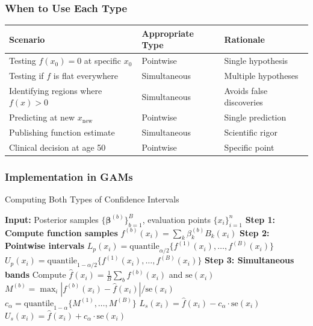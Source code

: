 \documentclass[12pt]{article}
\begin{document}
\subsubsection{When to Use Each Type}

\begin{table}[h]
\centering
\begin{tabular}{lll}
\toprule
\textbf{Scenario} & \textbf{Appropriate Type} & \textbf{Rationale} \\
\midrule
Testing $f(x_0) = 0$ at specific $x_0$ & Pointwise & Single hypothesis \\
Testing if $f$ is flat everywhere & Simultaneous & Multiple hypotheses \\
Identifying regions where $f(x) > 0$ & Simultaneous & Avoids false discoveries \\
Predicting at new $x_{\text{new}}$ & Pointwise & Single prediction \\
Publishing function estimate & Simultaneous & Scientific rigor \\
Clinical decision at age 50 & Pointwise & Specific point \\
\bottomrule
\end{tabular}
\end{table}

\subsubsection{Implementation in GAMs}

\begin{algorithm}
\caption{Computing Both Types of Confidence Intervals}
\begin{algorithmic}[1]
\State \textbf{Input:} Posterior samples $\{\boldsymbol{\beta}^{(b)}\}_{b=1}^B$, evaluation points $\{x_i\}_{i=1}^n$
\State \textbf{Step 1: Compute function samples}
       \State $f^{(b)}(x_i) = \sum_k \beta_k^{(b)} B_k(x_i)$
   \EndFor
\EndFor
\State 
\State \textbf{Step 2: Pointwise intervals}
   \State $L_p(x_i) = \text{quantile}_{\alpha/2}\{f^{(1)}(x_i), \ldots, f^{(B)}(x_i)\}$
   \State $U_p(x_i) = \text{quantile}_{1-\alpha/2}\{f^{(1)}(x_i), \ldots, f^{(B)}(x_i)\}$
\EndFor
\State 
\State \textbf{Step 3: Simultaneous bands}
\State Compute $\hat{f}(x_i) = \frac{1}{B}\sum_b f^{(b)}(x_i)$ and $\text{se}(x_i)$
   \State $M^{(b)} = \max_i |f^{(b)}(x_i) - \hat{f}(x_i)|/\text{se}(x_i)$
\EndFor
\State $c_\alpha = \text{quantile}_{1-\alpha}\{M^{(1)}, \ldots, M^{(B)}\}$
   \State $L_s(x_i) = \hat{f}(x_i) - c_\alpha \cdot \text{se}(x_i)$
   \State $U_s(x_i) = \hat{f}(x_i) + c_\alpha \cdot \text{se}(x_i)$
\EndFor
\end{algorithmic}
\end{algorithm}
\end{document}

